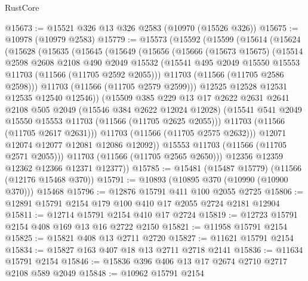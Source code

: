 \begin{lexlean}{RustCore}
\begin{coremodule}
@15673 := @15521 @326 @13 @326 @2583 (@10970 (@15526 @326))
@15675 := @10978 (@10979 @2583)
@15779 := @15573
    (@15592
      (@15599
        (@15614
          (@15624
            (@15628
              (@15635
                (@15645
                  (@15649
                    (@15656
                      (@15666
                        (@15673 @15675)
                        (@15514
                          @2598
                          @2608
                          @2108
                          @490
                          @2049
                          @15532
                          (@15541 @495 @2049 @15550 @15553 @11703 (@11566 (@11705 @2592 @2055)))
                          @11703
                          (@11566 (@11705 @2586 @2598)))
                        @11703
                        (@11566 (@11705 @2579 @2599)))
                      @12525
                      @12528
                      @12531
                      @12535
                      @12540
                      @12546))
                  (@15509
                    @385
                    @229
                    @13
                    @17
                    @2622
                    @2631
                    @2641
                    @2108
                    @505
                    @2049
                    (@15546 @384 @2622 @12024 @12028)
                    (@15541 @541 @2049 @15550 @15553 @11703 (@11566 (@11705 @2625 @2055)))
                    @11703
                    (@11566 (@11705 @2617 @2631)))
                  @11703
                  (@11566 (@11705 @2575 @2632)))
                @12071
                @12074
                @12077
                @12081
                @12086
                @12092))
            @15553
            @11703
            (@11566 (@11705 @2571 @2055)))
          @11703
          (@11566 (@11705 @2565 @2650)))
        @12356
        @12359
        @12362
        @12366
        @12371
        @12377))
@15785 := @15481 (@15487 @15779) (@11566 (@12176 @15468 @370))
@15791 := @10893 (@10895 @370 (@10990 (@10900 @370))) @15468
@15796 := @12876 @15791 @411 @100 @2055 @2725
@15806 := @12891 @15791 @2154 @179 @100 @410 @17 @2055 @2724 @2181 @12904
@15811 := @12714 @15791 @2154 @410 @17 @2724
@15819 := @12723 @15791 @2154 @408 @169 @13 @16 @2722 @2150
@15821 := @11958 @15791 @2154
@15825 := @15821 @408 @13 @2711 @2720
@15827 := @11621 @15791 @2154
@15834 := @15827 @163 @407 @18 @13 @2711 @2718 @2141
@15836 := @11634 @15791 @2154
@15846 := @15836 @396 @406 @13 @17 @2674 @2710 @2717 @2108 @589 @2049
@15848 := @10962 @15791 @2154

\end{coremodule}
\end{lexlean}
